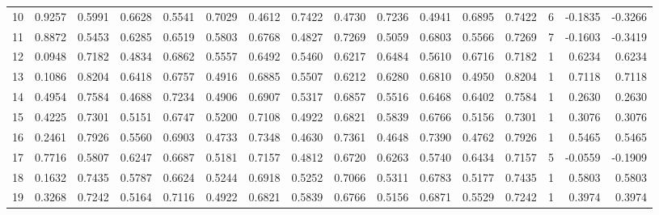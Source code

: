 \begin{tabular}{lrrrrrrrrrrrrrrr}
10 &      0.9257 &  0.5991 &  0.6628 &  0.5541 &  0.7029 &  0.4612 &  0.7422 &  0.4730 &  0.7236 &  0.4941 &   0.6895 &     0.7422 &      6 &                   -0.1835 &                    -0.3266 \\
11 &      0.8872 &  0.5453 &  0.6285 &  0.6519 &  0.5803 &  0.6768 &  0.4827 &  0.7269 &  0.5059 &  0.6803 &   0.5566 &     0.7269 &      7 &                   -0.1603 &                    -0.3419 \\
12 &      0.0948 &  0.7182 &  0.4834 &  0.6862 &  0.5557 &  0.6492 &  0.5460 &  0.6217 &  0.6484 &  0.5610 &   0.6716 &     0.7182 &      1 &                    0.6234 &                     0.6234 \\
13 &      0.1086 &  0.8204 &  0.6418 &  0.6757 &  0.4916 &  0.6885 &  0.5507 &  0.6212 &  0.6280 &  0.6810 &   0.4950 &     0.8204 &      1 &                    0.7118 &                     0.7118 \\
14 &      0.4954 &  0.7584 &  0.4688 &  0.7234 &  0.4906 &  0.6907 &  0.5317 &  0.6857 &  0.5516 &  0.6468 &   0.6402 &     0.7584 &      1 &                    0.2630 &                     0.2630 \\
15 &      0.4225 &  0.7301 &  0.5151 &  0.6747 &  0.5200 &  0.7108 &  0.4922 &  0.6821 &  0.5839 &  0.6766 &   0.5156 &     0.7301 &      1 &                    0.3076 &                     0.3076 \\
16 &      0.2461 &  0.7926 &  0.5560 &  0.6903 &  0.4733 &  0.7348 &  0.4630 &  0.7361 &  0.4648 &  0.7390 &   0.4762 &     0.7926 &      1 &                    0.5465 &                     0.5465 \\
17 &      0.7716 &  0.5807 &  0.6247 &  0.6687 &  0.5181 &  0.7157 &  0.4812 &  0.6720 &  0.6263 &  0.5740 &   0.6434 &     0.7157 &      5 &                   -0.0559 &                    -0.1909 \\
18 &      0.1632 &  0.7435 &  0.5787 &  0.6624 &  0.5244 &  0.6918 &  0.5252 &  0.7066 &  0.5311 &  0.6783 &   0.5177 &     0.7435 &      1 &                    0.5803 &                     0.5803 \\
19 &      0.3268 &  0.7242 &  0.5164 &  0.7116 &  0.4922 &  0.6821 &  0.5839 &  0.6766 &  0.5156 &  0.6871 &   0.5529 &     0.7242 &      1 &                    0.3974 &                     0.3974 \\
\bottomrule
\end{tabular}
